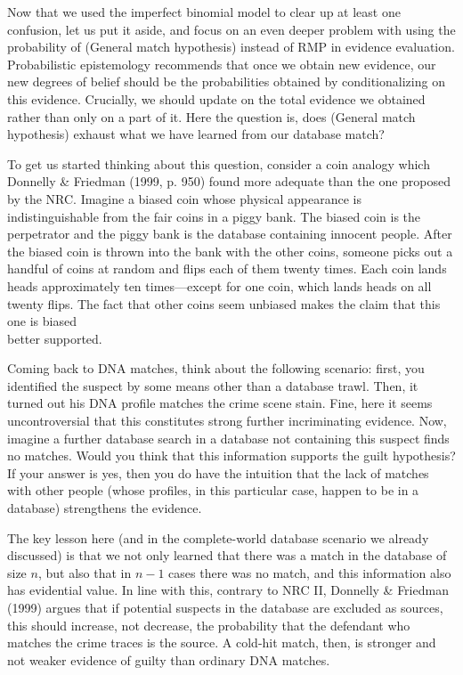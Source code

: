 \documentclass[
  10pt,
  dvipsnames,enabledeprecatedfontcommands]{scrartcl}
\begin{document}
Now that we used the imperfect binomial model to clear up at least one
confusion, let us put it aside, and focus on an even deeper problem with
using the probability of (General match hypothesis) instead of RMP in
evidence evaluation. Probabilistic epistemology recommends that once we
obtain new evidence, our new degrees of belief should be the
probabilities obtained by conditionalizing on this evidence. Crucially,
we should update on the total evidence we obtained rather than only on a
part of it. Here the question is, does (General match hypothesis)
exhaust what we have learned from our database match?

To get us started thinking about this question, consider a coin analogy
which Donnelly \& Friedman (1999, p. 950) found more adequate than the
one proposed by the NRC. Imagine a biased coin whose physical appearance
is indistinguishable from the fair coins in a piggy bank. The biased
coin is the perpetrator and the piggy bank is the database containing
innocent people. After the biased coin is thrown into the bank with the
other coins, someone picks out a handful of coins at random and flips
each of them twenty times. Each coin lands heads approximately ten
times---except for one coin, which lands heads on all twenty flips. The
fact that other coins seem unbiased makes the claim that this one is
biased\\
better supported.

Coming back to DNA matches, think about the following scenario: first,
you identified the suspect by some means other than a database trawl.
Then, it turned out his DNA profile matches the crime scene stain. Fine,
here it seems uncontroversial that this constitutes strong further
incriminating evidence. Now, imagine a further database search in a
database not containing this suspect finds no matches. Would you think
that this information supports the guilt hypothesis? If your answer is
yes, then you do have the intuition that the lack of matches with other
people (whose profiles, in this particular case, happen to be in a
database) strengthens the evidence.

The key lesson here (and in the complete-world database scenario we
already discussed) is that we not only learned that there was a match in
the database of size \(n\), but also that in \(n-1\) cases there was no
match, and this information also has evidential value. In line with
this, contrary to NRC II, Donnelly \& Friedman (1999) argues that if
potential suspects in the database are excluded as sources, this should
increase, not decrease, the probability that the defendant who matches
the crime traces is the source. A cold-hit match, then, is stronger and
not weaker evidence of guilty than ordinary DNA matches.
\end{document}
